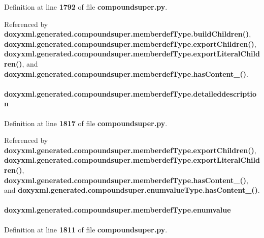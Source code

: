 Definition at line {\bf 1792} of file {\bf compoundsuper.\+py}.



Referenced by {\bf doxyxml.\+generated.\+compoundsuper.\+memberdef\+Type.\+build\+Children()}, {\bf doxyxml.\+generated.\+compoundsuper.\+memberdef\+Type.\+export\+Children()}, {\bf doxyxml.\+generated.\+compoundsuper.\+memberdef\+Type.\+export\+Literal\+Children()}, and {\bf doxyxml.\+generated.\+compoundsuper.\+memberdef\+Type.\+has\+Content\+\_\+()}.

\paragraph[{detaileddescription}]{\setlength{\rightskip}{0pt plus 5cm}doxyxml.\+generated.\+compoundsuper.\+memberdef\+Type.\+detaileddescription}\label{classdoxyxml_1_1generated_1_1compoundsuper_1_1memberdefType_ab1c8355c9bc50c55f8f9ab15739bf6a2}


Definition at line {\bf 1817} of file {\bf compoundsuper.\+py}.



Referenced by {\bf doxyxml.\+generated.\+compoundsuper.\+memberdef\+Type.\+export\+Children()}, {\bf doxyxml.\+generated.\+compoundsuper.\+memberdef\+Type.\+export\+Literal\+Children()}, {\bf doxyxml.\+generated.\+compoundsuper.\+memberdef\+Type.\+has\+Content\+\_\+()}, and {\bf doxyxml.\+generated.\+compoundsuper.\+enumvalue\+Type.\+has\+Content\+\_\+()}.

\paragraph[{enumvalue}]{\setlength{\rightskip}{0pt plus 5cm}doxyxml.\+generated.\+compoundsuper.\+memberdef\+Type.\+enumvalue}\label{classdoxyxml_1_1generated_1_1compoundsuper_1_1memberdefType_aa6d40bf2d93feb3595e90344cc983937}


Definition at line {\bf 1811} of file {\bf compoundsuper.\+py}.



